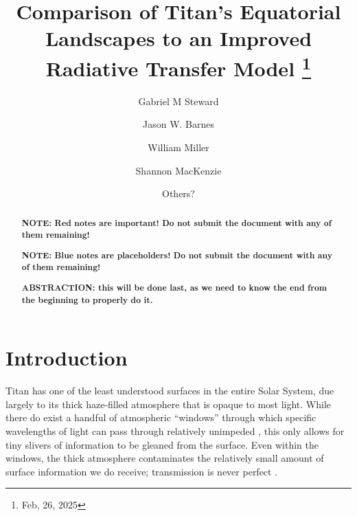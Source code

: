 \documentclass[twocolumn,linenumbers]{aastex631}
\begin{document}
\title{Comparison of Titan's Equatorial Landscapes to an Improved Radiative Transfer Model
\footnote{Feb, 26, 2025}}

\author[0000-0002-8482-4669]{Gabriel M Steward}

\author{Jason W. Barnes}

\author{William Miller}

\author{Shannon MacKenzie}

\author{Others?}

\begin{abstract}

\textbf{\color{red}NOTE: Red notes are important! Do not submit the document with any of them remaining!\color{black}}

\textbf{\color{blue}NOTE: Blue notes are placeholders! Do not submit the document with any of them remaining!\color{black}}

\textbf{\color{red}ABSTRACTION: this will be done last, as we need to know the end from the beginning to properly do it.\color{black}}

\end{abstract}


\section{Introduction} \label{sec:intro}

Titan has one of the least understood surfaces in the entire Solar System, due largely to its thick haze-filled atmosphere that is opaque to most light. While there do exist a handful of atmospheric ``windows'' through which specific wavelengths of light can pass through relatively unimpeded \citep{Barnes2007}, this only allows for tiny slivers of information to be gleaned from the surface. Even within the windows, the thick atmosphere contaminates the relatively small amount of surface information we do receive; transmission is never perfect \citep{EsSayeh2023}. 
\end{document}
